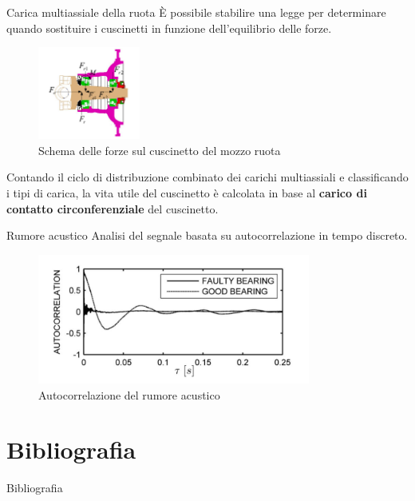 \documentclass{beamer}
\begin{document}
\begin{frame}{Carica multiassiale della ruota}
    \small
    È possibile stabilire una legge per determinare quando sostituire i cuscinetti in funzione dell'equilibrio delle forze\cite{zhao2021service}.

    \begin{figure}
        \centering
        \includegraphics[width=0.3\textwidth]{Figures/Force_Diagram.png}
        \caption{Schema delle forze sul cuscinetto del mozzo ruota}
        \label{fig:Forces_Bearing}
    \end{figure}

    Contando il ciclo di distribuzione combinato dei carichi multiassiali e classificando i tipi di carica, la vita utile del cuscinetto è calcolata in base al \textbf{carico di contatto circonferenziale} del cuscinetto.
\end{frame}

\begin{frame}{Rumore acustico}
    Analisi del segnale basata su autocorrelazione in tempo discreto.

    \begin{figure}
        \centering
        \includegraphics[width=0.8\textwidth]{Figures/Acoustic.png}
        \caption{Autocorrelazione del rumore acustico}
        \label{fig:acoustic}
    \end{figure}


\end{frame}

\section*{Bibliografia}

\begin{frame}[allowframebreaks]{Bibliografia}
    \printbibliography
\end{frame}
\end{document}
